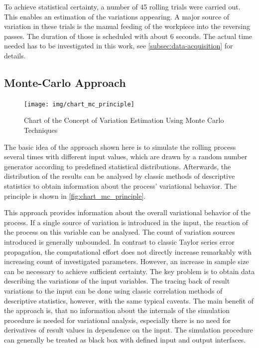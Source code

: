 To achieve statistical certainty, a number of 45 rolling trials were carried out.
This enables an estimation of the variations appearing.
A major source of variation in these trials is the manual feeding of the workpiece into the reversing passes.
The duration of those is scheduled with about 6 seconds.
The actual time needed has to be investigated in this work, see \autoref{subsec:data-acquisition} for details.

\subsection{Monte-Carlo Approach}\label{subsec:monte-carlo-approach}

\begin{figure}
    \centering
    \texttt{[image: img/chart\_mc\_principle]}
    \caption{Chart of the Concept of Variation Estimation Using Monte Carlo Techniques}
    \label{fig:chart_mc_principle}
\end{figure}

The basic idea of the approach shown here is to simulate the rolling process several times with different input values, which are drawn by a random number generator according to predefined statistical distributions.
Afterwards, the distribution of the results can be analysed by classic methods of descriptive statistics to obtain information about the process' variational behavior.
The principle is shown in \autoref{fig:chart_mc_principle}.

This approach provides information about the overall variational behavior of the process.
If a single source of variation is introduced in the input, the reaction of the process on this variable can be analysed.
The count of variation sources introduced is generally unbounded.
In contrast to classic Taylor series error propagation, the computational effort does not directly increase remarkably with increasing count of investigated parameters.
However, an increase in sample size can be necessary to achieve sufficient certainty.
The key problem is to obtain data describing the variations of the input variables.
The tracing back of result variations to the input can be done using classic correlation methods of descriptive statistics, however, with the same typical caveats.
The main benefit of the approach is, that no information about the internals of the simulation procedure is needed for variational analysis, especially there is no need for derivatives of result values in dependence on the input.
The simulation procedure can generally be treated as black box with defined input and output interfaces.

